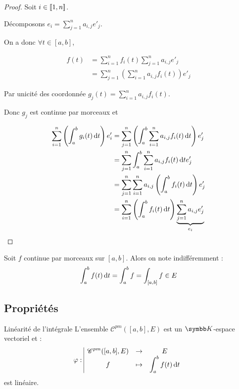 \begin{proof}
    Soit $i \in [\![1, n]\!]$. 

    Décomposons $e_i = \displaystyle \sum_{j=1}^n a_{i,j} e'_j$.

    On a donc $\forall t \in [a, b]$, 

    \begin{align*}
        f(t) & = \sum_{i=1}^n f_i(t) \sum_{j=1}^n a_{i,j} e'_j \\
        & = \sum_{j=1}^n \left( \sum_{i=1}^n a_{i,j} f_i(t) \right) e'_j
    \end{align*}

    Par unicité des coordonnée $\displaystyle g_j(t) = \sum_{i=1}^n a_{i,j} f_i(t)$.

    Donc $g_j$ est continue par morceaux et 

    \begin{align*}
        \sum_{i=1}^n \left( \int_a^b g_i(t) \,\mathrm{d}t \right) e'_i & = \sum_{j=1}^n \left( \int_a^b \sum_{i=1}^n a_{i,j} f_i(t) \,\mathrm{d}t \right) e'_j \\
            & = \sum_{j=1}^n \int_a^b \sum_{i=1}^n a_{i,j} f_i(t) \,\mathrm{d}t e'_j \\
            & = \sum_{j=1}^n \sum_{i=1}^n a_{i,j} \left( \int_a^b f_i(t) \,\mathrm{d}t \right) e'_j \\
            & = \sum_{i=1}^n \left( \int_a^b f_i(t) \,\mathrm{d}t \right) \underbrace{\sum_{j=1}^n a_{i,j} e'_j}_{e_i} \\ 
    \end{align*}
\end{proof}

\begin{remarque}
Soit $f$ continue par morceaux sur $[a, b]$. Alors on note indifféremment :
\[\int_a^b f(t) \,\mathrm{d}t = \int_a^b f = \int_{[a, b]} f \in E\]
\end{remarque}

\subsection{Propriétés}

\begin{proposition}{Linéarité de l'intégrale}{}
    L'ensemble $\mathscr C^{pm}([a, b], E)$ est un $\K$-espace vectoriel et :
    \[\varphi: \space \begin{array}{|ccc} \displaystyle \mathscr C^{pm}([a, b], E) & \to & \displaystyle E \\ \displaystyle f & \mapsto & \displaystyle \int_a^b f(t) \,\mathrm{d}t \end{array}\]
    est linéaire. 
\end{proposition}



